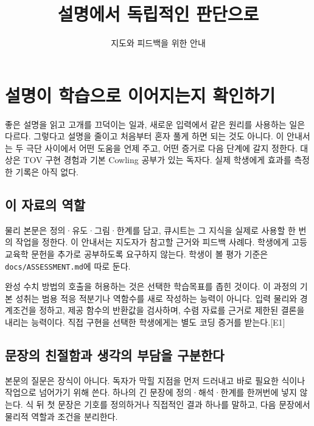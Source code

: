 \documentclass[
  10pt,
  a4paper,
]{article}
\title{설명에서 독립적인 판단으로}
\subtitle{지도와 피드백을 위한 안내}
\author{}
\date{}
\begin{document}
\maketitle

{
\hypersetup{linkcolor=}
\setcounter{tocdepth}{3}
\tableofcontents
}
\section{설명이 학습으로 이어지는지
확인하기}\label{uxc124uxba85uxc774-uxd559uxc2b5uxc73cuxb85c-uxc774uxc5b4uxc9c0uxb294uxc9c0-uxd655uxc778uxd558uxae30}

좋은 설명을 읽고 고개를 끄덕이는 일과, 새로운 입력에서 같은 원리를
사용하는 일은 다르다. 그렇다고 설명을 줄이고 처음부터 혼자 풀게 하면
되는 것도 아니다. 이 안내서는 두 극단 사이에서 어떤 도움을 언제 주고,
어떤 증거로 다음 단계에 갈지 정한다. 대상은 TOV 구현 경험과 기본 Cowling
공부가 있는 독자다. 실제 학생에게 효과를 측정한 기록은 아직 없다.

\subsection{이 자료의
역할}\label{uxc774-uxc790uxb8ccuxc758-uxc5eduxd560}

물리 본문은 정의·유도·그림·한계를 담고, 큐시트는 그 지식을 실제로 사용할
한 번의 작업을 정한다. 이 안내서는 지도자가 참고할 근거와 피드백 사례다.
학생에게 고등교육학 문헌을 추가로 공부하도록 요구하지 않는다. 학생이 볼
평가 기준은 \texttt{docs/ASSESSMENT.md}에 따로 둔다.

완성 수치 방법의 호출을 허용하는 것은 선택한 학습목표를 좁힌 것이다. 이
과정의 기본 성취는 범용 적응 적분기나 역함수를 새로 작성하는 능력이
아니다. 입력 물리와 경계조건을 정하고, 제공 함수의 반환값을 검사하며,
수렴 자료를 근거로 제한된 결론을 내리는 능력이다. 직접 구현을 선택한
학생에게는 별도 코딩 증거를 받는다.{[}E1{]}

\subsection{문장의 친절함과 생각의 부담을
구분한다}\label{uxbb38uxc7a5uxc758-uxce5cuxc808uxd568uxacfc-uxc0dduxac01uxc758-uxbd80uxb2f4uxc744-uxad6cuxbd84uxd55cuxb2e4}

본문의 질문은 장식이 아니다. 독자가 막힐 지점을 먼저 드러내고 바로
필요한 식이나 작업으로 넘어가기 위해 쓴다. 하나의 긴 문장에
정의·해석·한계를 한꺼번에 넣지 않는다. 식 뒤 첫 문장은 기호를 정의하거나
직접적인 결과 하나를 말하고, 다음 문장에서 물리적 역할과 조건을
분리한다.
\end{document}
